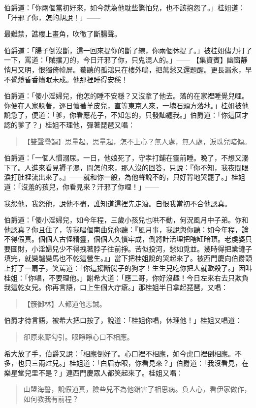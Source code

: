 伯爵道：「你兩個當初好來，如今就為他耽些驚怕兒，也不該抱怨了。」桂姐道：「汗邪了你，怎的胡說！」——

最難禁，譙樓上畫角，吹徹了斷腸聲。

伯爵道：「腸子倒沒斷，這一回來提你的斷了線，你兩個休提了。」被桂姐儘力打了一下，罵道：「賊攘刀的，今日汗邪了你，只鬼混人的。」——
【集資賓】幽窗靜悄月又明，恨獨倚幃屏。驀聽的孤鴻只在樓外鳴，把萬愁又還題醒。更長漏永，早不覺燈昏香燼眠未成。他那裡睡得安穩！

伯爵道：「傻小淫婦兒，他怎的睡不安穩？又沒拿了他去。落的在家裡睡覺兒哩。你便在人家躲著，逐日懷著羊皮兒，直等東京人來，一塊石頭方落地。」桂姐被他說急了，便道：「爹，你看應花子，不知怎的，只發訕纏我。」伯爵道：「你這回才認的爹了？」桂姐不理他，彈著琵琶又唱：
\begin{quote}
【雙聲疊韻】思量起，思量起，怎不上心？無人處，無人處，淚珠兒暗傾。
\end{quote}

伯爵道：「一個人慣溺尿。一日，他娘死了，守孝打鋪在靈前睡。晚了，不想又溺下了。人進來看見褥子濕，問怎的來，那人沒的回答，只說：『你不知，我夜間眼淚打肚裡流出來了。』——就和你一般，為他聲說不的，只好背地哭罷了。」桂姐道：「沒羞的孩兒，你看見來？汗邪了你哩！」——

我怨他，我怨他，說他不盡，誰知道這裡先走滾。自恨我當初不合他認真。

伯爵道：「傻小淫婦兒，如今年程，三歲小孩兒也哄不動，何況風月中子弟。你和他認真？你且住了，等我唱個南曲兒你聽：『風月事，我說與你聽：如今年程，論不得假真。個個人古怪精靈，個個人久慣牢成，倒將計活埋把瞎缸暗頂。老虔婆只要圖財，小淫婦兒少不得拽著脖子往前掙。苦似投河，愁如覓並。幾時得把業罐子填完，就變驢變馬也不乾這營生。』」當下把桂姐說的哭起來了。被西門慶向伯爵頭上打了一扇子，笑罵道：「你這搊斷腸子的狗才！生生兒吃你把人就歐殺了。」因叫桂姐：「你唱，不要理他。」謝希大道：「應二哥，你好沒趣！今日左來右去只欺負我這乾女兒。你再言語，口上生個大疔瘡。」那桂姐半日拿起琵琶，又唱：
\begin{quote}
【簇御林】人都道他志誠。
\end{quote}

伯爵才待言語，被希大把口按了，說道：「桂姐你唱，休理他！」桂姐又唱道：
\begin{quote}
卻原來廝勾引。眼睜睜心口不相應。
\end{quote}

希大放了手，伯爵又說：「相應倒好了。心口裡不相應，如今虎口裡倒相應。不多，也只三兩炷兒。」桂姐道：「白眉赤眼，你看見來？」伯爵道：「我沒看見，在樂星堂兒里不是？」連西門慶眾人都笑起來了。桂姐又唱：
\begin{quote}
山盟海誓，說假道真，險些兒不為他錯害了相思病。負人心，看伊家做作，如何教我有前程？
\end{quote}

